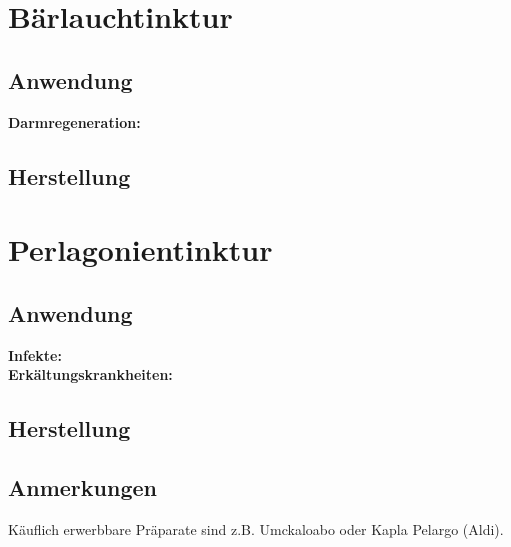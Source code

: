 


\newpage



\section{Bärlauchtinktur}



\subsection{Anwendung}
\textbf{Darmregeneration:} \\ 

\subsection{Herstellung}




\newpage



\section{Perlagonientinktur}


 

\subsection{Anwendung}
\textbf{Infekte:} \\ 

\textbf{Erkältungskrankheiten:} \\ 


\subsection{Herstellung}

\subsection{Anmerkungen}

Käuflich erwerbbare Präparate sind z.B. Umckaloabo oder Kapla Pelargo (Aldi).







